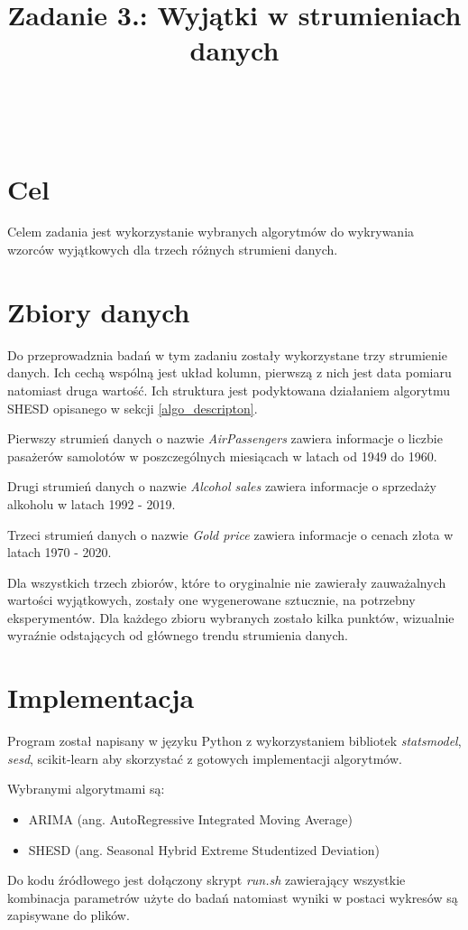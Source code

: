 \documentclass{classrep}
\author{%
    \studentinfo[239671@edu.p.lodz.pl]{Jan Karwowski}{239671}\\
    \studentinfo[239676@edu.p.lodz.pl]{Kamil Kowalewski}{239676}\\
}
\title{Zadanie 3.: Wyjątki w strumieniach danych}
\begin{document}
    \maketitle
    \thispagestyle{fancyplain}

    \tableofcontents
    \newpage

    \section{Cel} {
        Celem zadania jest wykorzystanie wybranych algorytmów do wykrywania wzorców
        wyjątkowych dla trzech różnych strumieni danych.
    }

    \section{Zbiory danych} {
        Do przeprowadznia badań w tym zadaniu zostały wykorzystane trzy strumienie danych.
        Ich cechą wspólną jest układ kolumn, pierwszą z nich jest data pomiaru
        natomiast druga wartość. Ich struktura jest podyktowana działaniem algorytmu
        SHESD opisanego w sekcji \ref{algo_descripton}.

        Pierwszy strumień danych o nazwie \textit{AirPassengers}\cite{air_passengers}
        zawiera informacje o liczbie pasażerów samolotów w poszczególnych miesiącach w
        latach od 1949 do 1960.

        Drugi strumień danych o nazwie \textit{Alcohol sales}\cite{alcohol_sales}
        zawiera informacje o sprzedaży alkoholu w latach 1992 - 2019.

        Trzeci strumień danych o nazwie \textit{Gold price}\cite{gold_price}
        zawiera informacje o cenach złota w latach 1970 - 2020.

        Dla wszystkich trzech zbiorów, które to oryginalnie nie zawierały zauważalnych wartości
        wyjątkowych, zostały one wygenerowane sztucznie, na potrzebny eksperymentów. Dla każdego
        zbioru wybranych zostało kilka punktów, wizualnie wyraźnie odstających od głównego trendu
        strumienia danych.
    }

    \section{Implementacja} {
        Program został napisany w języku Python z wykorzystaniem bibliotek
        \textit{statsmodel}\cite{statsmodel}, \textit{sesd}\cite{sesd},
        scikit-learn\cite{sklearn} aby skorzystać z gotowych implementacji algorytmów.

        Wybranymi algorytmami są:
        \begin{itemize}
            \item ARIMA (ang. AutoRegressive Integrated Moving Average)
            \item SHESD (ang. Seasonal Hybrid Extreme Studentized Deviation)
        \end{itemize}

        Do kodu źródłowego jest dołączony skrypt \textit{run.sh} zawierający wszystkie
        kombinacja parametrów użyte do badań natomiast wyniki w postaci wykresów są
        zapisywane do plików.
    }
\end{document}
